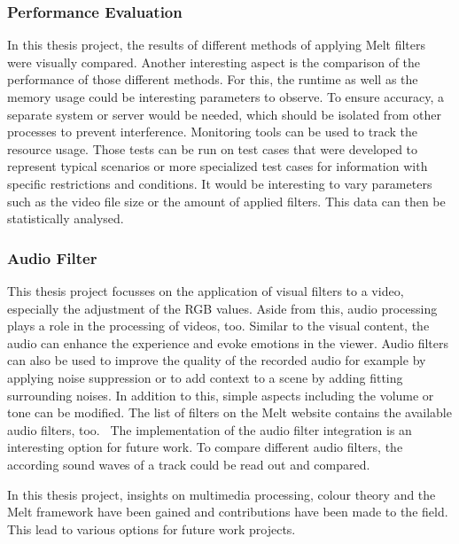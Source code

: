 \documentclass[../MasterThesis.tex]{subfiles}
\begin{document}
\subsubsection*{Performance Evaluation}


In this thesis project, the results of different methods of applying Melt filters were visually compared. Another interesting aspect is the comparison of the performance of those different methods. For this, the runtime as well as the memory usage could be interesting parameters to observe. 
To ensure accuracy, a separate system or server would be needed, which should be isolated from other processes to prevent interference. Monitoring tools can be used to track the resource usage. 
Those tests can be run on test cases that were developed to represent typical scenarios or more specialized test cases for information with specific restrictions and conditions.
It would be interesting to vary parameters such as the video file size or the amount of applied filters.
This data can then be statistically analysed.












\subsubsection*{Audio Filter}

This thesis project focusses on the application of visual filters to a video, especially the adjustment of the RGB values. Aside from this, audio processing plays a role in the processing of videos, too. Similar to the visual content, the audio can enhance the experience and evoke emotions in the viewer. Audio filters can also be used to improve the quality of the recorded audio for example by applying noise suppression or to add context to a scene by adding fitting surrounding noises. In addition to this, simple aspects including the volume or tone can be modified.
The list of filters on the Melt website contains the available audio filters, too.~\cite{melt}
The implementation of the audio filter integration is an interesting option for future work. To compare different audio filters, the according sound waves of a track could be read out and compared.




In this thesis project, insights on multimedia processing, colour theory and the Melt framework have been gained and contributions have been made to the field. This lead to various options for future work projects.







	
	
\end{document}
